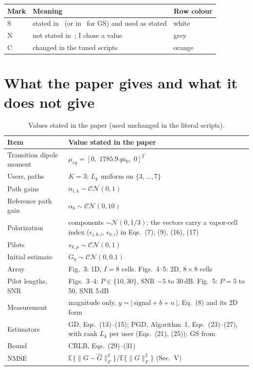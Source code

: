 \documentclass[11pt,a4paper]{article}
\newcommand{\E}{\mathbb{E}}
\begin{document}
\begin{center}
\small
\begin{tabular}{lll}
\toprule
Mark & Meaning & Row colour \\
\midrule
S & stated in~\cite{xu2025} (or in~\cite{cui2024} for GS) and used as stated & white \\
N & not stated in~\cite{xu2025}; I chose a value & \colorbox{notstated}{grey} \\
C & changed in the tuned scripts & \colorbox{changed}{orange} \\
\bottomrule
\end{tabular}
\end{center}

\section{What the paper gives and what it does not give}
\label{sec:given}

\begin{table}[h!]
\centering
\small
\caption{Values stated in the paper (used unchanged in the literal scripts).}
\label{tab:stated}
\begin{tabularx}{\textwidth}{L{4.2cm} Y}
\toprule
Item & Value stated in the paper \\
\midrule
Transition dipole moment & $\mu_{eg}=[0,\;1785.9\,q a_0,\;0]^T$ \\
Users, paths & $K=3$; $L_k$ uniform on $\{3,\dots,7\}$ \\
Path gains & $\alpha_{l,k}\sim\mathcal{CN}(0,1)$ \\
Reference path gain & $\alpha_b\sim\mathcal{CN}(0,10)$ \\
Polarization & components $\sim\mathcal{N}(0,1/3)$; the vectors carry a vapor-cell index ($\epsilon_{i,k,l}$, $\epsilon_{b,i}$) in Eqs.~(7), (9), (16), (17) \\
Pilots & $s_{k,p}\sim\mathcal{CN}(0,1)$ \\
Initial estimate & $G_0\sim\mathcal{CN}(0,0.1)$ \\
Array & Fig.~3: 1D, $I=8$ cells. Figs.~4--5: 2D, $8\times8$ cells \\
Pilot lengths, SNR & Figs.~3--4: $P\in\{10,30\}$, SNR $-5$ to 30\,dB. Fig.~5: $P=5$ to 50, SNR 5\,dB \\
Measurement & magnitude only, $y=|\,\text{signal}+b+n\,|$, Eq.~(8) and its 2D form \\
Estimators & GD, Eqs.~(13)--(15); PGD, Algorithm~1, Eqs.~(23)--(27), with rank $L_k$ per user (Eqs.~(21), (25)); GS from~\cite{cui2024} \\
Bound & CRLB, Eqs.~(29)--(31) \\
NMSE & $\E\{\|G-\hat G\|_F^2\}/\E\{\|G\|_F^2\}$ (Sec.~V) \\
\bottomrule
\end{tabularx}
\end{table}
\end{document}
